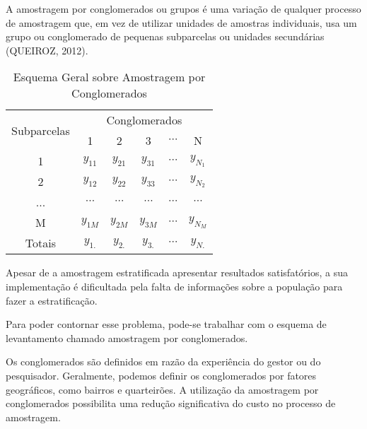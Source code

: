A amostragem por conglomerados ou grupos é uma variação de qualquer processo de amostragem que, em vez de utilizar unidades de amostras individuais, usa um grupo ou conglomerado de pequenas subparcelas ou unidades secundárias (QUEIROZ, 2012).\vskip0.3cm




\begin{table}[!htb]
\centering
    {
    \caption{Esquema Geral sobre Amostragem por Conglomerados}
    \label{amostras estratificada}
    \vspace{0.1cm}
\begin{tabular}{c|c|c|c|c|c}
\hline\hline
\multirow{2}{*}{Subparcelas} & \multicolumn{5}{c}{Conglomerados}              \\
\cline{2-6}
                             & 1         & 2        &   3       & $\cdots$ & N            \\
\hline\hline
1                            & $y_{11}$  & $y_{21}$ &  $y_{31}$ & $\cdots$ & $y_{N_{1}}$  \\
2                            & $y_{12}$  & $y_{22}$ &  $y_{33}$ & $\cdots$ & $y_{N_{2}}$  \\
...                          & $\cdots$  & $\cdots$ &  $\cdots$ & $\cdots$ & $\cdots$     \\
M                            & $y_{1M}$  & $y_{2M}$ &  $y_{3M}$ & $\cdots$ & $y_{N_{M}}$   \\
\hline\hline
Totais                       &  $y_{1.}$ & $y_{2.}$ &  $y_{3.}$ &   $\cdots$       & $y_{N.}$   \\
\hline
\end{tabular}}
\end{table}














\inic Apesar de a amostragem estratificada apresentar resultados
satisfatórios, a sua implementação é dificultada pela falta
de informações sobre a população para fazer a estratificação.\vskip0.3cm

Para poder contornar esse problema, pode-se trabalhar com o
esquema de levantamento chamado amostragem por conglomerados.\vskip0.3cm

Os conglomerados são definidos em razão da experiência
do gestor ou do pesquisador. Geralmente, podemos definir os
conglomerados por fatores geográficos, como bairros e quarteirões.
A utilização da amostragem por conglomerados possibilita uma
redução significativa do custo no processo de amostragem.\vskip0.3cm

